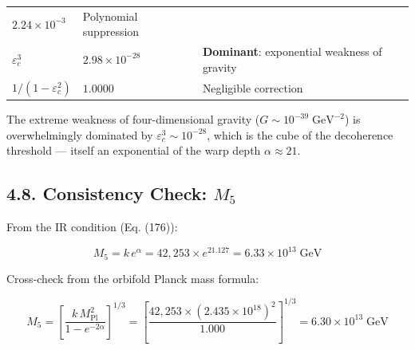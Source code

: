 \documentclass[
  11pt,
]{article}
\begin{document}
\begin{longtable}[]{@{}lll@{}}
\begin{minipage}[t]{0.30\columnwidth}
\(2.24 \times 10^{-3}\)\strut
\end{minipage} & \begin{minipage}[t]{0.26\columnwidth}\raggedright
Polynomial suppression\strut
\end{minipage}\tabularnewline
\begin{minipage}[t]{0.35\columnwidth}\raggedright
\(\varepsilon_c^3\)\strut
\end{minipage} & \begin{minipage}[t]{0.30\columnwidth}\raggedright
\(2.98 \times 10^{-28}\)\strut
\end{minipage} & \begin{minipage}[t]{0.26\columnwidth}\raggedright
\textbf{Dominant}: exponential weakness of gravity\strut
\end{minipage}\tabularnewline
\begin{minipage}[t]{0.35\columnwidth}\raggedright
\(1/(1-\varepsilon_c^2)\)\strut
\end{minipage} & \begin{minipage}[t]{0.30\columnwidth}\raggedright
\(1.0000\)\strut
\end{minipage} & \begin{minipage}[t]{0.26\columnwidth}\raggedright
Negligible correction\strut
\end{minipage}\tabularnewline
\bottomrule
\end{longtable}

The extreme weakness of four-dimensional gravity
(\(G \sim 10^{-39}\;\text{GeV}^{-2}\)) is overwhelmingly dominated by
\(\varepsilon_c^3 \sim 10^{-28}\), which is the cube of the decoherence
threshold --- itself an exponential of the warp depth
\(\alpha \approx 21\).

\bigskip

\hypertarget{consistency-check-m_5}{%
\subsection{\texorpdfstring{4.8. Consistency Check:
\(M_5\)}{4.8. Consistency Check: M\_5}}\label{consistency-check-m_5}}

From the IR condition (Eq. (176)):

\[M_5 = k\,e^{\alpha} = 42{,}253 \times e^{21.127} = 6.33 \times 10^{13}\;\text{GeV} \tag{196}\]

Cross-check from the orbifold Planck mass formula:

\[M_5 = \left[\frac{k\,M_{\text{Pl}}^2}{1 - e^{-2\alpha}}\right]^{1/3} = \left[\frac{42{,}253 \times (2.435 \times 10^{18})^2}{1.000}\right]^{1/3} = 6.30 \times 10^{13}\;\text{GeV} \tag{197}\]
\end{document}
